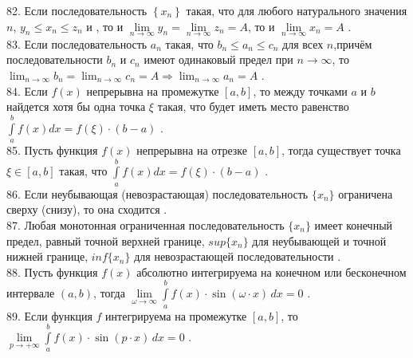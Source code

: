 \documentclass[12pt]{article}
\begin{document}
{82. Если последовательность ${\displaystyle \left\{ x_{n} \right\}}$ такая, что для любого натурального значения ${\displaystyle n}$, ${\displaystyle y_{n} \leq x_{n} \leq z_{n}}$ и , то и ${\displaystyle \lim \limits _{n \to \infty} y_n=\lim \limits _{n \to \infty} z_n=A}$, то и ${\lim \limits _{n \to \infty} x_n=A}$ .\\

83. Если последовательность ${\displaystyle a_{n}}$ такая, что ${\displaystyle b_{n}\leqslant a_{n}\leqslant c_{n}}$ для всех ${\displaystyle n}$,причём последовательности ${\displaystyle b_{n}}$  и  ${\displaystyle c_{n}}$ имеют одинаковый предел при ${\displaystyle n\to \infty }$, то ${\displaystyle \lim _{n\to \infty }b_{n}=\lim _{n\to \infty }c_{n}=A\Rightarrow \lim _{n\to \infty }a_{n}=A }$ .\\

84. Если ${\displaystyle f(x)}$ непрерывна на промежутке ${\displaystyle [a,b]}$, то между точками ${\displaystyle a}$ и ${\displaystyle b}$ найдется хотя бы одна точка  ${\displaystyle \xi}$ такая, что будет иметь место равенство ${\displaystyle \int \limits _{a}^{b} f(x) dx=f(\xi)\cdot (b-a)}$ .\\

85. Пусть функция ${\displaystyle f(x)}$ непрерывна на отрезке ${\displaystyle [a,b]}$, тогда существует точка ${\displaystyle \xi \in [a,b]}$ такая, что ${\displaystyle \int \limits _{a}^{b} f(x) dx=f(\xi)\cdot (b-a)}$ .\\

86. Если неубывающая (невозрастающая) последовательность ${\displaystyle \{x_n\}}$ ограничена сверху (снизу), то она сходится .\\

87. Любая монотонная ограниченная последовательность ${\displaystyle \{x_n\}}$ имеет конечный предел, равный точной верхней границе, ${\displaystyle sup \{x_n\}}$ для неубывающей и точной нижней границе, ${\displaystyle inf \{x_n\}}$ для невозрастающей последовательности .\\

88. Пусть функция ${\displaystyle f(x)}$ абсолютно интегрируема на конечном или бесконечном интервале ${\displaystyle (a,b)}$, тогда ${\displaystyle \lim \limits _{\omega \to \infty} \int \limits _{a}^{b} f(x)\cdot \sin (\omega\cdot x) \, dx=0}$ .\\

89. Если функция ${\displaystyle f}$ интегрируема на промежутке ${\displaystyle [a,b]}$, то ${\displaystyle \lim \limits _{p \to +\infty} \int \limits _{a}^{b} f(x)\cdot \sin (p\cdot x) \, dx=0}$ .\\

}
\end{document}
